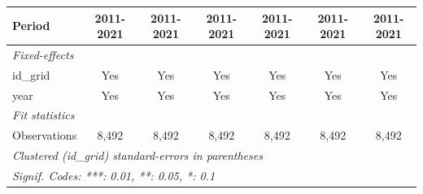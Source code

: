 \begin{tabular}{lcccccc}
   Period                     & 2011-2021    & 2011-2021     & 2011-2021      & 2011-2021     & 2011-2021      & 2011-2021\\  
   \midrule
   \emph{Fixed-effects}\\
   id\_grid                   & Yes          & Yes           & Yes            & Yes           & Yes            & Yes\\  
   year                       & Yes          & Yes           & Yes            & Yes           & Yes            & Yes\\  
   \midrule
   \emph{Fit statistics}\\
   Observations               & 8,492        & 8,492         & 8,492          & 8,492         & 8,492          & 8,492\\  
   \midrule \midrule
   \multicolumn{7}{l}{\emph{Clustered (id\_grid) standard-errors in parentheses}}\\
   \multicolumn{7}{l}{\emph{Signif. Codes: ***: 0.01, **: 0.05, *: 0.1}}\\
\end{tabular}
\par\endgroup


